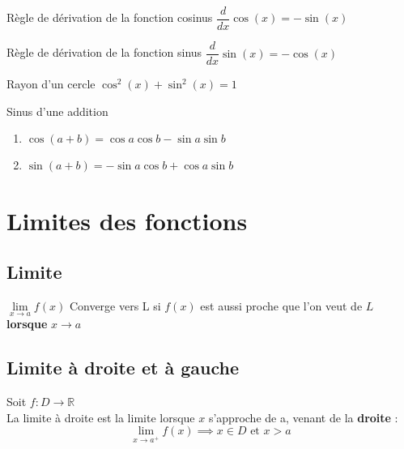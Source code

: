 \documentclass{report}
\begin{document}
\begin{multicols*}{3}
\begin{Identite}{Règle de dérivation de la fonction cosinus}{}
  $\dfrac{d}{dx}\cos\left(x\right) = -\sin\left(x\right)$
\end{Identite}

\begin{Identite}{Règle de dérivation de la fonction sinus}{}
  $\dfrac{d}{dx}\sin\left(x\right) = -\cos\left(x\right)$
\end{Identite}

\begin{Identite}{Rayon d'un cercle}{}
    $\cos^2\left(x\right) + \sin^2\left(x\right) = 1 $ 
\end{Identite}

\begin{Identite}{Sinus d'une addition}{}
    \begin{enumerate}
        \item $\cos\left(a +b \right) = \cos a \cos b -\sin a \sin b$
        \item $\sin\left(a +b \right) = -\sin a \cos b + \cos a \sin b$
    \end{enumerate}
 \end{Identite}

\chapter{Limites des fonctions}
\section{Limite}
\columnbreak
\begin{Definitionx*}{}{}
  $ \lim\limits_{x\to a}f(x)$ \textcolor{myb}{Converge vers L} si $f(x)$ est aussi proche que l'on veut de 
  $L$ \textbf{lorsque}   $x \to a$

\end{Definitionx*}
\vspace{-1em}

\section{Limite à droite et à gauche}
\begin{Definitionx*}{}{}
    Soit $f : D\rightarrow \mathbb{R}$ \\ 
    \textcolor{myb}{La limite à droite} est la limite lorsque $x$ s'approche de a, venant de la 
    \textbf{droite}   : \\ 
    \[ \lim\limits_{x\to a^{+}} f(x) \implies  x \in D \text{ et } x > a \] 


\end{Definitionx*}
\end{multicols*}
\end{document}
